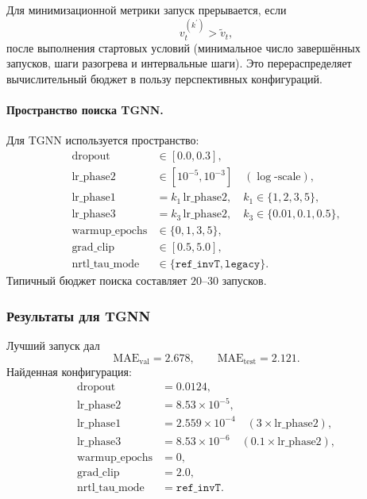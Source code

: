 \documentclass[11pt]{article}
\begin{document}
Для минимизационной метрики запуск прерывается, если
\begin{equation*}
v_t^{(k^\prime)} > \tilde v_t,
\end{equation*}
после выполнения стартовых условий (минимальное число завершённых запусков, шаги разогрева и интервальные шаги). Это перераспределяет вычислительный бюджет в пользу перспективных конфигураций.

\paragraph{Пространство поиска TGNN.}
Для TGNN используется пространство:
\begin{align*}
\text{dropout} &\in [0.0, 0.3], \\
\text{lr\_phase2} &\in [10^{-5}, 10^{-3}] \quad (\log\text{-scale}), \\
\text{lr\_phase1} &= k_1\,\text{lr\_phase2}, \quad k_1 \in \{1,2,3,5\}, \\
\text{lr\_phase3} &= k_3\,\text{lr\_phase2}, \quad k_3 \in \{0.01,0.1,0.5\}, \\
\text{warmup\_epochs} &\in \{0,1,3,5\}, \\
\text{grad\_clip} &\in [0.5,5.0], \\
\text{nrtl\_tau\_mode} &\in \{\texttt{ref\_invT},\texttt{legacy}\}.
\end{align*}
Типичный бюджет поиска составляет $20\text{--}30$ запусков.

\subsubsection{Результаты для TGNN}

Лучший запуск дал
\begin{equation*}
\mathrm{MAE}_{\mathrm{val}}=2.678,
\qquad
\mathrm{MAE}_{\mathrm{test}}=2.121.
\end{equation*}
Найденная конфигурация:
\begin{align*}
\text{dropout} &= 0.0124, \\
\text{lr\_phase2} &= 8.53\times10^{-5}, \\
\text{lr\_phase1} &= 2.559\times10^{-4} \quad (3\times\text{lr\_phase2}), \\
\text{lr\_phase3} &= 8.53\times10^{-6} \quad (0.1\times\text{lr\_phase2}), \\
\text{warmup\_epochs} &= 0, \\
\text{grad\_clip} &= 2.0, \\
\text{nrtl\_tau\_mode} &= \texttt{ref\_invT}.
\end{align*}
\end{document}
